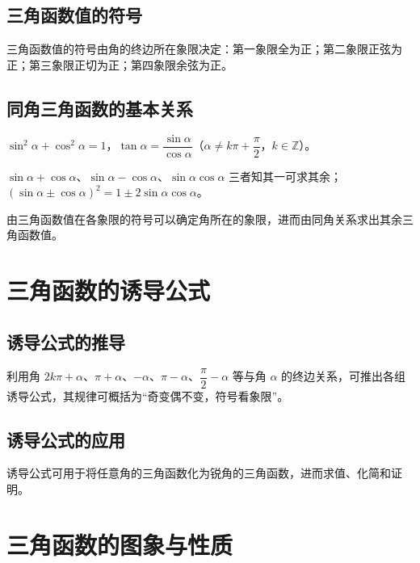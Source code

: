 \subsection{三角函数值的符号}
\begin{definition}[三角函数值的符号]
三角函数值的符号由角的终边所在象限决定：第一象限全为正；第二象限正弦为正；第三象限正切为正；第四象限余弦为正。
\end{definition}
\subsection{同角三角函数的基本关系}
\begin{definition}[同角三角函数的基本关系]
$\sin^2\alpha+\cos^2\alpha=1$，$\tan\alpha=\dfrac{\sin\alpha}{\cos\alpha}$（$\alpha \neq k\pi+\dfrac{\pi}{2}$，$k \in \mathbb{Z}$）。
\end{definition}
\begin{theorem}[同角关系的常用变形]
$\sin\alpha+\cos\alpha$、$\sin\alpha-\cos\alpha$、$\sin\alpha\cos\alpha$ 三者知其一可求其余；$(\sin\alpha \pm \cos\alpha)^2=1 \pm 2\sin\alpha\cos\alpha$。
\end{theorem}
\begin{corollary}[三角函数值的符号与象限]
由三角函数值在各象限的符号可以确定角所在的象限，进而由同角关系求出其余三角函数值。
\end{corollary}

\section{三角函数的诱导公式}
\subsection{诱导公式的推导}
\begin{definition}[诱导公式]
利用角 $2k\pi+\alpha$、$\pi+\alpha$、$-\alpha$、$\pi-\alpha$、$\dfrac{\pi}{2}-\alpha$ 等与角 $\alpha$ 的终边关系，可推出各组诱导公式，其规律可概括为“奇变偶不变，符号看象限”。
\end{definition}
\subsection{诱导公式的应用}
\begin{definition}[诱导公式的应用]
诱导公式可用于将任意角的三角函数化为锐角的三角函数，进而求值、化简和证明。
\end{definition}

\section{三角函数的图象与性质}
